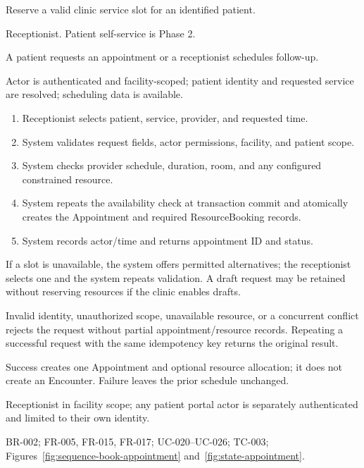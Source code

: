 \begin{description}[leftmargin=2.6cm,style=nextline]
\item[Goal] Reserve a valid clinic service slot for an identified patient.
\item[Primary actor] Receptionist. Patient self-service is Phase 2.
\item[Trigger] A patient requests an appointment or a receptionist schedules follow-up.
\item[Preconditions] Actor is authenticated and facility-scoped; patient identity and requested service are resolved; scheduling data is available.
\item[Main success flow]
\begin{enumerate}[leftmargin=1.4em]
  \item Receptionist selects patient, service, provider, and requested time.
  \item System validates request fields, actor permissions, facility, and patient scope.
  \item System checks provider schedule, duration, room, and any configured constrained resource.
  \item System repeats the availability check at transaction commit and atomically creates the Appointment and required ResourceBooking records.
  \item System records actor/time and returns appointment ID and status.
\end{enumerate}
\item[Alternative flows] If a slot is unavailable, the system offers permitted alternatives; the receptionist selects one and the system repeats validation. A draft request may be retained without reserving resources if the clinic enables drafts.
\item[Exception flows] Invalid identity, unauthorized scope, unavailable resource, or a concurrent conflict rejects the request without partial appointment/resource records. Repeating a successful request with the same idempotency key returns the original result.
\item[Postconditions and data] Success creates one Appointment and optional resource allocation; it does not create an Encounter. Failure leaves the prior schedule unchanged.
\item[Authorization] Receptionist in facility scope; any patient portal actor is separately authenticated and limited to their own identity.
\item[Trace] BR-002; FR-005, FR-015, FR-017; UC-020--UC-026; TC-003; Figures~\ref{fig:sequence-book-appointment} and~\ref{fig:state-appointment}.
\end{description}

